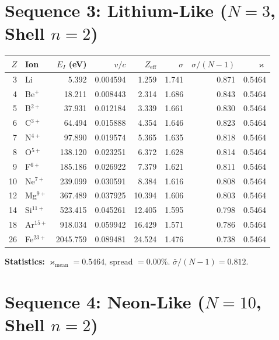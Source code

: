 \documentclass{article}
\newcommand{\kop}{\varkappa}
\begin{document}
\section{Sequence 3: Lithium-Like ($N = 3$, Shell $n = 2$)}

\begin{center}
\small
\begin{tabular}{rlrrrrrr}
\toprule
$Z$ & Ion & $E_I$ (eV) & $v/c$ & $Z_{\text{eff}}$ & $\sigma$ & $\sigma/(N{-}1)$ & $\kop$ \\
\midrule
 3 & Li          &    5.392 & 0.004594 &  1.259 &  1.741 & 0.871 & 0.5464 \\
 4 & Be$^+$      &   18.211 & 0.008443 &  2.314 &  1.686 & 0.843 & 0.5464 \\
 5 & B$^{2+}$    &   37.931 & 0.012184 &  3.339 &  1.661 & 0.830 & 0.5464 \\
 6 & C$^{3+}$    &   64.494 & 0.015888 &  4.354 &  1.646 & 0.823 & 0.5464 \\
 7 & N$^{4+}$    &   97.890 & 0.019574 &  5.365 &  1.635 & 0.818 & 0.5464 \\
 8 & O$^{5+}$    &  138.120 & 0.023251 &  6.372 &  1.628 & 0.814 & 0.5464 \\
 9 & F$^{6+}$    &  185.186 & 0.026922 &  7.379 &  1.621 & 0.811 & 0.5464 \\
10 & Ne$^{7+}$   &  239.099 & 0.030591 &  8.384 &  1.616 & 0.808 & 0.5464 \\
12 & Mg$^{9+}$   &  367.489 & 0.037925 & 10.394 &  1.606 & 0.803 & 0.5464 \\
14 & Si$^{11+}$  &  523.415 & 0.045261 & 12.405 &  1.595 & 0.798 & 0.5464 \\
18 & Ar$^{15+}$  &  918.034 & 0.059942 & 16.429 &  1.571 & 0.786 & 0.5464 \\
26 & Fe$^{23+}$  & 2045.759 & 0.089481 & 24.524 &  1.476 & 0.738 & 0.5464 \\
\bottomrule
\end{tabular}
\end{center}

\textbf{Statistics:} $\kop_{\text{mean}} = 0.5464$, spread $= 0.00\%$.  $\bar{\sigma}/(N{-}1) = 0.812$.


\section{Sequence 4: Neon-Like ($N = 10$, Shell $n = 2$)}
\end{document}
